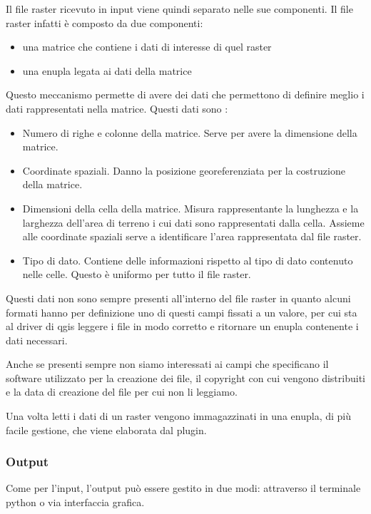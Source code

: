 Il file raster ricevuto in input viene quindi separato nelle sue componenti. Il file raster infatti è composto da due componenti:
\begin{itemize}
	\item una matrice che contiene i dati di interesse di quel raster
	\item una enupla legata ai dati della matrice
\end{itemize}
Questo meccanismo permette di avere dei dati che permettono di definire meglio i dati rappresentati nella matrice. Questi dati sono :

\begin{itemize}
	\item Numero di righe e colonne della matrice. Serve per avere la dimensione della matrice.
	\item Coordinate spaziali. Danno la posizione georeferenziata per la costruzione della matrice.
	\item Dimensioni della cella della matrice. Misura rappresentante la lunghezza e la larghezza dell'area di terreno i cui dati sono rappresentati dalla cella. Assieme alle coordinate spaziali serve a identificare l'area rappresentata dal file raster.
	\item Tipo di dato. Contiene delle informazioni rispetto al tipo di dato contenuto nelle celle. Questo è uniformo per tutto il file raster.
\end{itemize}

Questi dati non sono sempre presenti all'interno del file raster in quanto alcuni formati hanno per definizione uno di questi campi fissati a un valore, per cui sta al driver di qgis leggere i file in modo corretto e ritornare un enupla contenente i dati necessari.

Anche se presenti sempre non siamo interessati ai campi che specificano il software utilizzato per la creazione dei file, il copyright con cui vengono distribuiti e la data di creazione del file per cui non li leggiamo.

Una volta letti i dati di un raster vengono immagazzinati in una enupla, di più facile gestione, che viene elaborata dal plugin.

\subsubsection{Output}
Come per l'input, l'output può essere gestito in due modi: attraverso il terminale python o via interfaccia grafica.

